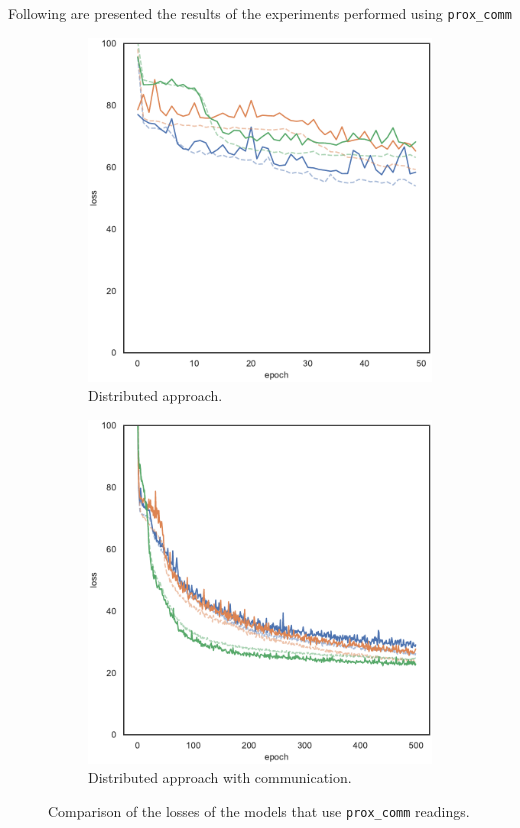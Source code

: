 Following are presented the results of the experiments performed using 
\texttt{prox\_comm}
\begin{figure}[!htb]
	\begin{center}
		\begin{subfigure}[h]{0.49\textwidth}
			\centering
			\includegraphics[width=.7\textwidth]{contents/images/task1-comm/loss-distributed-prox_comm@copy}
			\caption{Distributed approach.}
		\end{subfigure}
		\hfill
		\begin{subfigure}[h]{0.49\textwidth}
			\centering
			\includegraphics[width=.7\textwidth]{contents/images/task1-comm/loss-communication-prox_comm@copy}
			\caption{Distributed approach with communication.}
		\end{subfigure}	
	\end{center}
	\vspace{-0.5cm}
	\caption{Comparison of the losses of the models that use \texttt{prox\_comm} 
		readings.}
	\label{fig:commlossprox_comm}
\end{figure}

